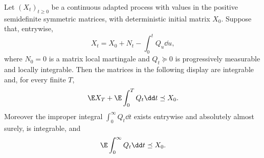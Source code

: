 \documentclass[../main.tex]{subfiles}
\begin{document}
\begin{lemma}
\label{lem:sol-positive-matrix-drift}
Let $(X_t)_{t\geq0}$ be a continuous adapted process with values in the positive semidefinite
symmetric matrices, with deterministic initial matrix $X_0$.  Suppose that, entrywise,
\begin{equation}
 X_t=X_0+N_t-\int_0^tQ_u\dd u,
 \label{eq:sol-abstract-matrix-decomposition}
\end{equation}
where $N_0=0$ is a matrix local martingale and $Q_t\succeq0$ is progressively measurable and
locally integrable.  Then the matrices in the following display are integrable and, for every
finite $T$,
\begin{equation}
 \E X_T+\E\int_0^TQ_t\dd t\preceq X_0.
 \label{eq:sol-abstract-finite}
\end{equation}
Moreover the improper integral $\int_0^\infty Q_t\dd t$ exists entrywise and absolutely almost
surely, is integrable, and
\begin{equation}
 \E\int_0^\infty Q_t\dd t\preceq X_0.
 \label{eq:sol-abstract-infinite}
\end{equation}
\end{lemma}
\end{document}
